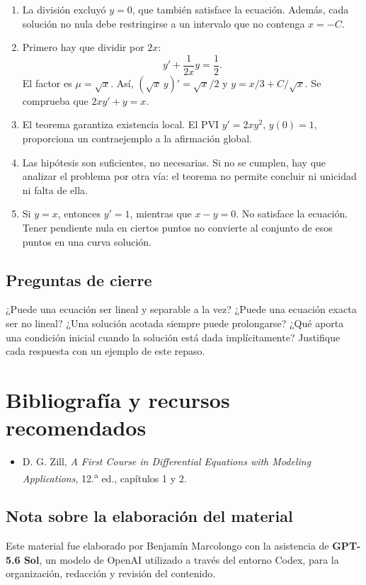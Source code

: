 \documentclass[12pt,a4paper]{article}
\begin{document}
	\begin{enumerate}[label=\arabic*.]
		\item La división excluyó \(y=0\), que también satisface la ecuación. Además, cada solución no nula debe restringirse a un intervalo que no contenga \(x=-C\).
		\item Primero hay que dividir por \(2x\):
		\[
		y'+\frac{1}{2x}y=\frac12.
		\]
		El factor es \(\mu=\sqrt{x}\). Así, \((\sqrt{x}\,y)'=\sqrt{x}/2\) y \(y=x/3+C/\sqrt{x}\). Se comprueba que \(2xy'+y=x\).
		\item El teorema garantiza existencia local. El PVI \(y'=2xy^2\), \(y(0)=1\), proporciona un contraejemplo a la afirmación global.
		\item Las hipótesis son suficientes, no necesarias. Si no se cumplen, hay que analizar el problema por otra vía: el teorema no permite concluir ni unicidad ni falta de ella.
		\item Si \(y=x\), entonces \(y'=1\), mientras que \(x-y=0\). No satisface la ecuación. Tener pendiente nula en ciertos puntos no convierte al conjunto de esos puntos en una curva solución.
	\end{enumerate}

	\subsection{Preguntas de cierre}

	¿Puede una ecuación ser lineal y separable a la vez? ¿Puede una ecuación exacta ser no lineal? ¿Una solución acotada siempre puede prolongarse? ¿Qué aporta una condición inicial cuando la solución está dada implícitamente? Justifique cada respuesta con un ejemplo de este repaso.


	\section*{Bibliografía y recursos recomendados}

	\begin{itemize}[leftmargin=*]
		\item D. G. Zill, \textit{A First Course in Differential Equations with Modeling Applications}, 12.\textsuperscript{a} ed., capítulos 1 y 2.
	\end{itemize}

	\subsection*{Nota sobre la elaboración del material}

	Este material fue elaborado por Benjamín Marcolongo con la asistencia de \textbf{GPT-5.6 Sol}, un modelo de OpenAI utilizado a través del entorno Codex, para la organización, redacción y revisión del contenido.
\end{document}
